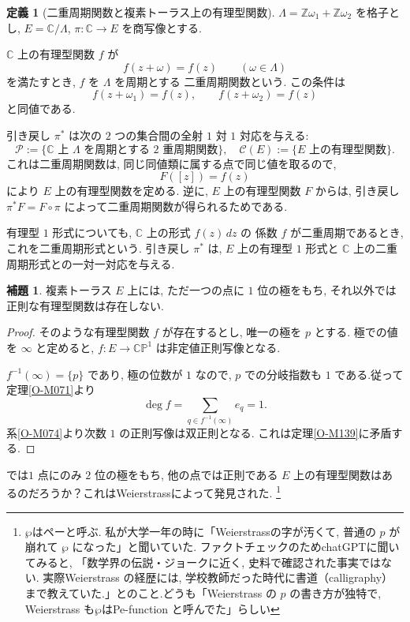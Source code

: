 \documentclass[dvipdfmx,a4paper,11pt]{article} %
\newcommand{\Z}{\mathbb{Z}}
\newcommand{\C}{\mathbb{C}}
\theoremstyle{definition}
\numberwithin{equation}{section}
\newtheorem{lem}[thm]{補題}
\newtheorem{dfn}[thm]{定義}
\begin{document}
\begin{dfn}[二重周期関数と複素トーラス上の有理型関数]
\label{O-M136}
$\Lambda=\Z\omega_1+\Z\omega_2$ を格子とし, 
$E=\C/\Lambda$, $\pi:\C\to E$ を商写像とする.

$\C$ 上の有理型関数 $f$ が
\[
f(z+\omega)=f(z)\qquad(\omega\in\Lambda)
\]
を満たすとき, $f$ を $\Lambda$ を周期とする
二重周期関数という.
この条件は
\[
f(z+\omega_1)=f(z),\qquad f(z+\omega_2)=f(z)
\]
と同値である.

引き戻し $\pi^*$ は次の $2$ つの集合間の全射 $1$ 対 $1$ 対応を与える:
\[
\mathcal{P}:=\{\C{}\text{ 上 }\Lambda\text{ を周期とする }2\text{ 重周期関数}\},
\quad
\mathcal{C}(E):=\{E\text{ 上の有理型関数}\}.
\]
これは二重周期関数は, 同じ同値類に属する点で同じ値を取るので, 
\[
F([z])=f(z)
\]
により $E$ 上の有理型関数を定める.
逆に, $E$ 上の有理型関数 $F$ からは, 
引き戻し $\pi^*F=F\circ \pi$ によって二重周期関数が得られるためである. 
\end{dfn}
有理型 $1$ 形式についても, $\C$ 上の形式 $f(z)\,dz$ の
係数 $f$ が二重周期であるとき, これを二重周期形式という.
引き戻し $\pi^*$ は, $E$ 上の有理型 $1$ 形式と
$\C$ 上の二重周期形式との一対一対応を与える.



\begin{lem}\label{O-M140}
複素トーラス $E$ 上には, ただ一つの点に $1$ 位の極をもち, 
それ以外では正則な有理型関数は存在しない.
\end{lem}

\begin{proof}
そのような有理型関数 $f$ が存在するとし, 唯一の極を $p$ とする.
極での値を $\infty$ と定めると, 
$f:E\to\C\mathbb P^1$ は非定値正則写像となる.

$f^{-1}(\infty)=\{p\}$ であり, 極の位数が $1$ なので, 
$p$ での分岐指数も $1$ である.従って定理\ref{O-M071}より
\[
\deg f=\sum_{q\in f^{-1}(\infty)}e_q=1.
\]
系\ref{O-M074}より次数 $1$ の正則写像は双正則となる. 
これは定理\ref{O-M139}に矛盾する. 
\end{proof}


では$1$ 点にのみ $2$ 位の極をもち, 他の点では正則である $E$ 上の有理型関数はあるのだろうか？これはWeierstrassによって発見された. \footnote{$\wp$はペーと呼ぶ. 私が大学一年の時に「Weierstrassの字が汚くて, 普通の \(p\) が崩れて \(\wp\) になった」と聞いていた. ファクトチェックのためchatGPTに聞いてみると, 「数学界の伝説・ジョークに近く, 史料で確認された事実ではない. 実際Weierstrass の経歴には, 学校教師だった時代に書道（calligraphy）まで教えていた.」とのこと.どうも「Weierstrass の \(p\) の書き方が独特で, Weierstrass も$\wp$はPe-function と呼んでた」らしい}
\end{document}
